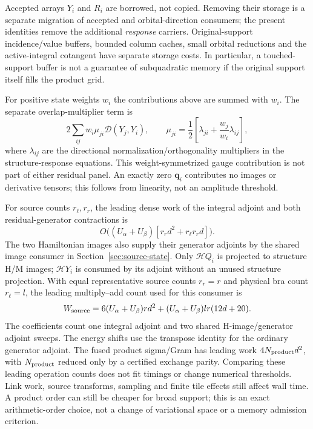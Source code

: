 \documentclass[11pt,a4paper]{article}
\newcommand{\Ha}{\mathcal H}
\renewcommand{\vv}[1]{\mathbf{#1}}
\begin{document}
Accepted arrays $Y_i$ and $R_i$ are borrowed, not copied. Removing their
storage is a separate migration of accepted and orbital-direction consumers;
the present identities remove the additional \emph{response} carriers.
Original-support incidence/value buffers, bounded column caches, small
orbital reductions and the active-integral cotangent have separate storage
costs. In particular, a touched-support buffer is not a guarantee of
subquadratic memory if the original support itself fills the product grid.

For positive state weights $w_i$ the contributions above are summed with $w_i$.
The separate overlap-multiplier term is
\begin{equation}
 2\sum_{ij} w_i\mu_{ji}\mathcal D(Y_j,Y_i),\qquad
 \mu_{ji}=\frac12\left[\lambda_{ji}+\frac{w_j}{w_i}\lambda_{ij}\right],
\end{equation}
where $\lambda_{ij}$ are the directional normalization/orthogonality multipliers
in the structure-response equations. This weight-symmetrized gauge
contribution is not part of either residual panel.
An exactly zero $\vv q_i$ contributes no images or derivative tensors;
this follows from linearity, not an amplitude threshold.

For source counts $r_\ell,r_r$, the leading dense work of the integral
adjoint and both residual-generator contractions is
\begin{equation}
 O\bigl((U_\alpha+U_\beta)
        [r_r d^2+r_\ell r_r d]\bigr).
\end{equation}
The two Hamiltonian images also supply their generator adjoints by the
shared image consumer in Section~\ref{sec:source-state}. Only $\Ha Q_i$
is projected to structure H/M images; $\Ha Y_i$ is consumed by its adjoint
without an unused structure projection. With equal
representative source counts $r_r=r$ and physical bra count $r_\ell=l$,
the leading multiply--add count used for this consumer is
\begin{equation}
 W_{\rm source}=6(U_\alpha+U_\beta)rd^2
            +(U_\alpha+U_\beta)lr(12d+20).
\end{equation}
The coefficients count one integral adjoint and two shared H-image/generator
adjoint sweeps. The energy shifts use the transpose identity for the ordinary
generator adjoint. The fused product sigma/Gram has leading
work $4N_{\rm product}d^2$, with $N_{\rm product}$ reduced only by a
certified exchange parity. Comparing these leading operation counts
does not fit timings or change numerical thresholds. Link work,
source transforms, sampling and finite tile effects still affect wall time.
A product order
can still be cheaper for broad support; this is an exact arithmetic-order
choice, not a change of variational space or a memory admission criterion.
\end{document}
